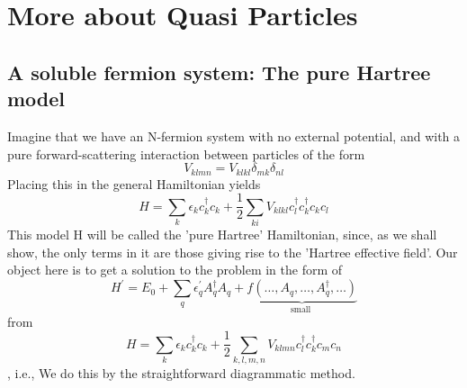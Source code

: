 \newpage
\section{More about Quasi Particles}
\subsection{A soluble fermion system: The pure Hartree model}
Imagine that we have an N-fermion system with no external potential, and with a pure forward-scattering interaction between particles of the form
$$V_{k l m n}=V_{k l k l} \delta_{m k} \delta_{n l}$$
Placing this in the general Hamiltonian yields
\begin{equation}H=\sum_{k} \epsilon_{k} c_{k}^{\dagger} c_{k}+\frac{1}{2} \sum_{k i} V_{k l k l} c_{l}^{\dagger} c_{k}^{\dagger} c_{k} c_{l}
\label{pure-hartree-hamil}
\end{equation}
This model H will be called the 'pure Hartree' Hamiltonian, since, as we shall show, the only terms in it are those giving rise to the 'Hartree effective field'. Our object here is to get a solution to the problem in the form of 
\begin{equation}H^{\prime}=E_{0}+\sum_{q} \epsilon_{q}^{\prime} A_{q}^{\dagger} A_{q}+\underbrace{f\left(\ldots, A_{q}, \ldots, A_{q}^{\dagger}, \ldots\right)}_{\text {small }}\end{equation}
from
\begin{equation}H=\sum_{k} \epsilon_{k} c_{k}^{\dagger} c_{k}+\frac{1}{2} \sum_{k, l, m, n} V_{k l m n} c_{l}^{\dagger} c_{k}^{\dagger} c_{m} c_{n}\end{equation},
i.e.,  We do this by the straightforward diagrammatic method.

